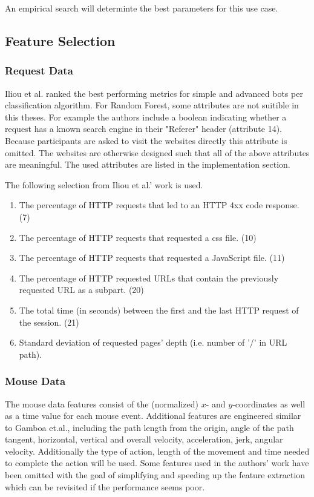 \documentclass[
    fontsize=12pt,
    headings=small,
    parskip=half,           %
    bibliography=totoc,
    numbers=noenddot,       %
    open=any,               %
    final                   %
]{scrreprt}
\begin{document}
An empirical search will determinte the best parameters for this use case.

\subsection{Feature Selection}

\subsubsection{Request Data}

Iliou et al. \cite{10.1145/3339252.3339267} ranked the best performing metrics for simple and advanced bots per classification algorithm. For Random Forest, some attributes are not suitible in this theses. For example the authors include a boolean indicating whether a request has a known search engine in their "Referer" header (attribute 14). Because participants are asked to visit the websites directly this attribute is omitted. The websites are otherwise designed such that all of the above attributes are meaningful. The used attributes are listed in the implementation section.

The following selection from Iliou et al.' work \cite{10.1145/3339252.3339267} is used.

\begin{enumerate}
	\item The percentage of HTTP requests that led to an HTTP 4xx code response. (7)
	\item The percentage of HTTP requests that requested a css file. (10)
	\item The percentage of HTTP requests that requested a JavaScript file. (11)
	\item The percentage of HTTP requested URLs that contain the previously requested URL as a subpart. (20)
	\item The total time (in seconds) between the first and the last HTTP request of the session. (21)
	\item Standard deviation of requested pages' depth (i.e. number of ’/’ in URL path).
\end{enumerate}

\label{concept_mouse_data}
\subsubsection{Mouse Data}

The mouse data features consist of the (normalized) $x$- and $y$-coordinates as well as a time value for each mouse event. Additional features are engineered similar to Gamboa et.al.\cite{GAMBOA2004}, including the path length from the origin, angle of the path tangent, horizontal, vertical and overall velocity, acceleration, jerk, angular velocity. Additionally the type of action, length of the movement and time needed to complete the action will be used. Some features used in the authors' work have been omitted with the goal of simplifying and speeding up the feature extraction which can be revisited if the performance seems poor.
\end{document}
